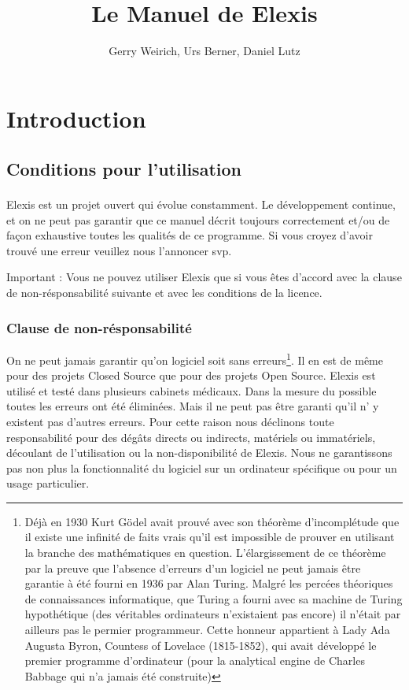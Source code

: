 \documentclass[paper=a4,BCOR8.25mm,twoside]{scrbook}
\author{Gerry Weirich, Urs Berner, Daniel Lutz}
\title{Le Manuel de Elexis\textsuperscript{\textregistered}}
\begin{document}
\maketitle

\tableofcontents

\part{Introduction}
\chapter{Conditions pour l'utilisation}
Elexis\textsuperscript{\textregistered} est un projet ouvert qui évolue constamment. Le développement continue, et on ne peut pas garantir que ce manuel décrit toujours correctement et/ou de façon exhaustive toutes les qualités de ce programme. Si vous croyez d'avoir trouvé une erreur veuillez nous l'annoncer svp.

Important : Vous ne pouvez utiliser Elexis que si vous êtes d'accord avec la clause de non-résponsabilité suivante et avec les conditions de la licence.


\section{Clause de non-résponsabilité}
On ne peut jamais garantir qu'on logiciel soit sans erreurs\footnote{Déjà en 1930 Kurt Gödel avait prouvé avec son théorème d'incomplétude que il existe une infinité de faits vrais qu'il est impossible de prouver en utilisant la branche des mathématiques en question. L'élargissement de ce théorème par la preuve que l'absence d'erreurs d'un logiciel ne peut jamais être garantie à été fourni en 1936 par Alan Turing. Malgré les percées théoriques de connaissances informatique, que Turing a fourni avec sa machine de Turing hypothétique (des véritables ordinateurs n'existaient pas encore) il n'était par ailleurs pas le permier programmeur. Cette honneur appartient à Lady Ada Augusta Byron, Countess of Lovelace (1815-1852), qui avait développé le premier programme d'ordinateur (pour la analytical engine de Charles Babbage qui n'a jamais été construite)}. Il en est de même pour des projets Closed Source que pour des projets Open Source. Elexis est utilisé et testé dans plusieurs cabinets médicaux. Dans la mesure du possible toutes les erreurs ont été éliminées. Mais il ne peut pas être garanti qu'il n' y existent pas d'autres erreurs.
Pour cette raison nous déclinons toute responsabilité pour des dégâts directs ou indirects, matériels ou immatériels, découlant de l'utilisation ou la non-disponibilité de Elexis. Nous ne garantissons pas non plus la fonctionnalité du logiciel sur un ordinateur spécifique ou pour un usage particulier.
\end{document}
